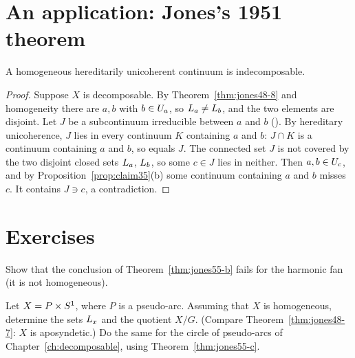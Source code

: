 
\section{An application: Jones's 1951 theorem}

\begin{theorem}\label{thm:jones51-1}
A homogeneous hereditarily unicoherent continuum is indecomposable.
\end{theorem}

\begin{proof}
Suppose $X$ is decomposable. By Theorem~\ref{thm:jones48-8} and homogeneity there are $a,b$ with $b\in U_{a}$, so
$L_{a}\neq L_{b}$, and the two elements are disjoint. Let $J$ be a subcontinuum irreducible between $a$ and $b$
(). By hereditary unicoherence, $J$ lies in every continuum $K$ containing $a$ and $b$: $J\cap K$ is a
continuum containing $a$ and $b$, so equals $J$. The connected set $J$ is not covered by the two disjoint closed sets
$L_{a}$, $L_{b}$, so some $c\in J$ lies in neither. Then $a,b\in U_{c}$, and by Proposition~\ref{prop:claim35}(b) some
continuum containing $a$ and $b$ misses $c$. It contains $J\ni c$, a contradiction.
\end{proof}


\section*{Exercises}

\begin{exercise}
Show that the conclusion of Theorem~\ref{thm:jones55-b} fails for the harmonic fan (it is not homogeneous).
\end{exercise}

\begin{exercise}
Let $X=P\times S^1$, where $P$ is a pseudo-arc. Assuming that $X$ is homogeneous, determine the sets $L_{x}$ and the
quotient $X/G$. (Compare Theorem~\ref{thm:jones48-7}: $X$ is aposyndetic.) Do the same for the circle of pseudo-arcs
of Chapter~\ref{ch:decomposable}, using Theorem~\ref{thm:jones55-c}.
\end{exercise}

